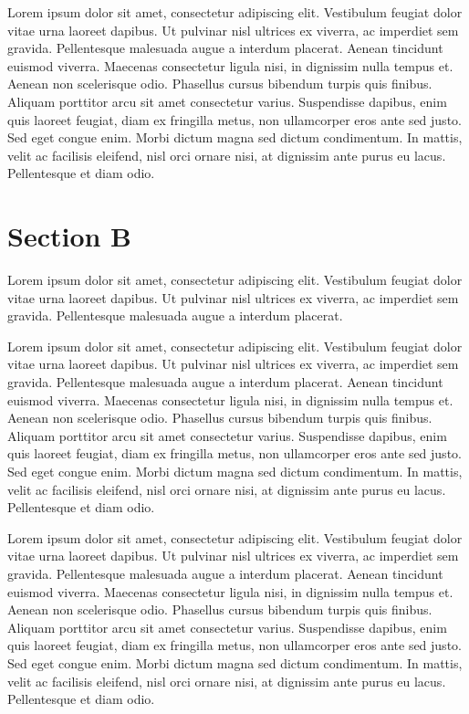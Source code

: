 \documentclass{article}
\begin{document}
\resumenumbering  
\pstart  
Lorem ipsum dolor sit amet, consectetur adipiscing elit. Vestibulum feugiat dolor vitae urna laoreet dapibus. Ut pulvinar nisl ultrices ex viverra, ac imperdiet sem gravida. Pellentesque malesuada augue a interdum placerat. Aenean tincidunt euismod viverra. Maecenas consectetur ligula nisi, in dignissim nulla tempus et. Aenean non scelerisque odio. Phasellus cursus bibendum turpis quis finibus. Aliquam porttitor arcu sit amet consectetur varius. Suspendisse dapibus, enim quis laoreet feugiat, diam ex fringilla metus, non ullamcorper eros ante sed justo. Sed eget congue enim. Morbi dictum magna sed dictum condimentum. In mattis, velit ac facilisis eleifend, nisl orci ornare nisi, at dignissim ante purus eu lacus. Pellentesque et diam odio.
\pend  
\endnumbering

\section{Section B}

\begin{pairs}
\begin{Leftside} 
\beginnumbering  
\pstart  
Lorem ipsum dolor sit amet, consectetur adipiscing elit. Vestibulum feugiat dolor vitae urna laoreet dapibus. Ut pulvinar nisl ultrices ex viverra, ac imperdiet sem gravida. Pellentesque malesuada augue a interdum placerat. 
\pend  
\pausenumbering 
\end{Leftside}

\begin{Rightside}   
\beginnumbering  
\pstart  
Lorem ipsum dolor sit amet, consectetur adipiscing elit. Vestibulum feugiat dolor vitae urna laoreet dapibus. Ut pulvinar nisl ultrices ex viverra, ac imperdiet sem gravida. Pellentesque malesuada augue a interdum placerat. Aenean tincidunt euismod viverra. Maecenas consectetur ligula nisi, in dignissim nulla tempus et. Aenean non scelerisque odio. Phasellus cursus bibendum turpis quis finibus. Aliquam porttitor arcu sit amet consectetur varius. Suspendisse dapibus, enim quis laoreet feugiat, diam ex fringilla metus, non ullamcorper eros ante sed justo. Sed eget congue enim. Morbi dictum magna sed dictum condimentum. In mattis, velit ac facilisis eleifend, nisl orci ornare nisi, at dignissim ante purus eu lacus. Pellentesque et diam odio.
\pend  
\endnumbering
\end{Rightside}  
\end{pairs}  
\Columns

\resumenumbering  
\pstart  
Lorem ipsum dolor sit amet, consectetur adipiscing elit. Vestibulum feugiat dolor vitae urna laoreet dapibus. Ut pulvinar nisl ultrices ex viverra, ac imperdiet sem gravida. Pellentesque malesuada augue a interdum placerat. Aenean tincidunt euismod viverra. Maecenas consectetur ligula nisi, in dignissim nulla tempus et. Aenean non scelerisque odio. Phasellus cursus bibendum turpis quis finibus. Aliquam porttitor arcu sit amet consectetur varius. Suspendisse dapibus, enim quis laoreet feugiat, diam ex fringilla metus, non ullamcorper eros ante sed justo. Sed eget congue enim. Morbi dictum magna sed dictum condimentum. In mattis, velit ac facilisis eleifend, nisl orci ornare nisi, at dignissim ante purus eu lacus. Pellentesque et diam odio.
\pend  
\end{document}
